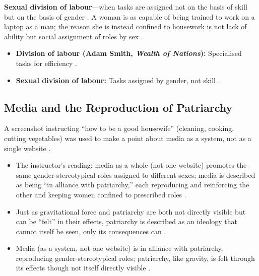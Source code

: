 \begin{KeyConcept}
\textbf{Sexual division of labour}---when tasks are assigned not on the basis of skill but on the basis of gender . A woman is as capable of being trained to work on a laptop as a man; the reason she is instead confined to housework is not lack of ability but social assignment of roles by sex .
\end{KeyConcept}

\begin{QuickRevision}
\begin{itemize}
    \item \textbf{Division of labour (Adam Smith, \textit{Wealth of Nations}):} Specialised tasks for efficiency .
    \item \textbf{Sexual division of labour:} Tasks assigned by gender, not skill .
\end{itemize}
\end{QuickRevision}

\subsection{Media and the Reproduction of Patriarchy}
A screenshot instructing ``how to be a good housewife'' (cleaning, cooking, cutting vegetables) was used to make a point about media as a system, not as a single website .

\begin{CriticalPoint}
\begin{itemize}
    \item The instructor's reading: media as a whole (not one website) promotes the same gender-stereotypical roles assigned to different sexes; media is described as being ``in alliance with patriarchy,'' each reproducing and reinforcing the other and keeping women confined to prescribed roles .
    \item Just as gravitational force and patriarchy are both not directly visible but can be ``felt'' in their effects, patriarchy is described as an ideology that cannot itself be seen, only its consequences can .
\end{itemize}
\end{CriticalPoint}

\begin{QuickRevision}
\begin{itemize}
    \item Media (as a system, not one website) is in alliance with patriarchy, reproducing gender-stereotypical roles; patriarchy, like gravity, is felt through its effects though not itself directly visible .
\end{itemize}
\end{QuickRevision}

